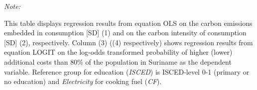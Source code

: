 \begin{table}[htbp!]
\begin{adjustbox}{width = 1\textwidth, max height = 0.95\textheight, center}
\begin{threeparttable}[b]
         \begin{tablenotes}\item \medskip \textit{Note:}
            \item This table displays regression results from equation OLS on the carbon emissions embedded in consumption [SD] (1) and on the carbon intensity of consumption [SD] (2), respectively. 
                                      Column (3) ((4) respectively) shows regression results from equation LOGIT on the log-odds transformed probability of higher (lower) additional costs than 80\% of the population in Suriname as the dependent variable. Reference group for education (\textit{ISCED}) is ISCED-level 0-1 (primary or no education) and \textit{Electricity} for cooking fuel (\textit{CF}).
         \end{tablenotes}
      \end{threeparttable}
   \end{adjustbox}
\end{table}


